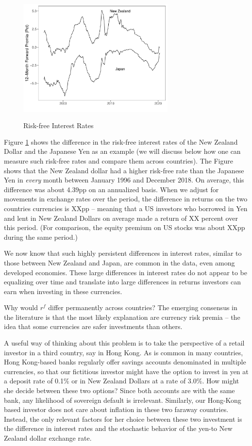 \documentclass[12pt,letter]{article}
\theoremstyle{break} \theorembodyfont{\normalfont\itshape}
\theoremstyle{break}
\theoremstyle{break} \theorembodyfont{\normalfont\itshape}
\theoremstyle{break} \theorembodyfont{\normalfont\itshape}
\begin{document}
\begin{figure}
    \centering
    \caption{Risk-free Interest Rates}
    \includegraphics[width=0.7\textwidth]{Exhibits/Figure_FP12M_JPYNZD.pdf}
    \label{fig:fp}
\end{figure}
Figure \ref{fig:fp} shows the difference in the risk-free interest rates of the
New Zealand Dollar and the Japanese Yen as an example (we will discuss
below how one can measure such risk-free rates and compare them across
countries). The Figure shows that the New Zealand dollar had a higher
risk-free rate than the Japanese Yen in \textit{every} month between
January 1996 and December 2018. On average, this difference was about 
4.39pp on an annualized basis. When we adjust for movements in exchange rates over
the period, the difference in returns on the two countries currencies
is XXpp -- meaning that a US investors who borrowed in Yen and lent in
New Zealand Dollars on average made a return of XX percent over this
period. (For comparison, the equity premium on US stocks was about
XXpp during the same period.)

We now know that such highly persistent differences in interest rates,
similar to those between New Zealand and Japan, are common in the
data, even among developed economies. These large differences in
interest rates do not appear to be equalizing over
time and translate into large differences in returns investors can
earn when investing in these currencies.

Why would $r^f$ differ permanently across countries? The emerging
consensus in the literature is that the most likely explanation are
currency risk premia -- the idea that some currencies are safer
investments than others. 

A useful way of thinking about this problem
is to take the perspective of a retail investor in a third country, say in Hong Kong.
As is common in many countries, Hong Kong-based banks regularly offer savings accounts denominated in multiple currencies, so that our fictitious investor might have the option to invest in yen at a deposit rate of 0.1\% or in New Zealand Dollars at a rate of 3.0\%. How might she decide between these two options? Since both accounts are with the same bank, any likelihood of sovereign default is irrelevant. Similarly, our Hong-Kong based investor does not care about inflation in these two faraway countries. Instead, the only relevant factors for her choice between these two investment is the difference in interest rates and the stochastic behavior of the yen-to New Zealand dollar exchange rate. 
\end{document}
